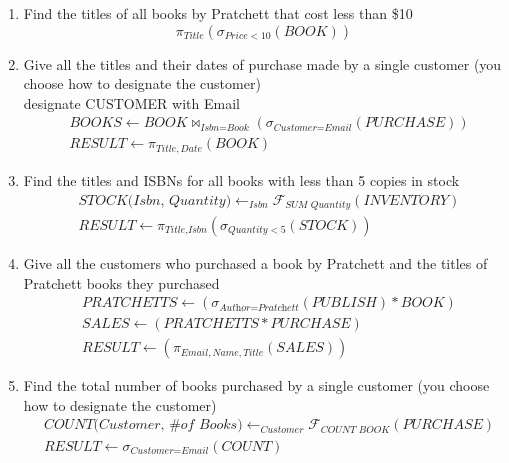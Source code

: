 \documentclass[12pt, letterpaper]{report}
\begin{document}
\begin{enumerate}
\begin{enumerate}
  \item Find the titles of all books by Pratchett that cost less than \$10
    \begin{equation*}
      \pi_{\textit{Title}}(\sigma_{\textit{Price} < 10}(BOOK))
    \end{equation*}

  \item Give all the titles and their dates of purchase made by a single
    customer (you choose how to designate the customer)\\
    designate CUSTOMER with Email
    \begin{align*}
      &\textit{BOOKS} \leftarrow \textit{BOOK} \bowtie_{\textit{Isbn} = \textit{Book}} (\sigma_{\textit{Customer}=\textit{Email}}(\textit{PURCHASE}))\\
      &\textit{RESULT} \leftarrow \pi_{Title, Date} (\textit{BOOK})
    \end{align*}

  \item Find the titles and ISBNs for all books with less than 5 copies in stock
    \begin{align*}
      &\textit{STOCK(Isbn, Quantity)} \leftarrow _{\textit{Isbn}}\mathcal{F}_{\textit{SUM Quantity}}(\textit{INVENTORY})\\
      &\textit{RESULT} \leftarrow \pi_{\textit{Title}, \textit{Isbn}}(\sigma_{\textit{Quantity} < 5}(STOCK))
    \end{align*}

  \item Give all the customers who purchased a book by Pratchett and the titles of Pratchett books they purchased
    \begin{align*}
      &\textit{PRATCHETTS} \leftarrow (\sigma_{\textit{Author} = \textit{Pratchett}}(\textit{PUBLISH}) * \textit{BOOK})\\
      &\textit{SALES} \leftarrow (\textit{PRATCHETTS} * \textit{PURCHASE})\\
      &\textit{RESULT} \leftarrow (\pi_{\textit{Email}, \textit{Name}, \textit{Title}}(\textit{SALES}))
    \end{align*}

  \item Find the total number of books purchased by a single customer (you choose how to designate the customer)
    \begin{align*}
      &\textit{COUNT(Customer, \# of Books)} \leftarrow _{\textit{Customer}}\mathcal{F}_{\textit{COUNT BOOK}}(\textit{PURCHASE})\\
      &\textit{RESULT} \leftarrow \sigma_{\textit{Customer} = \textit{Email}}(\textit{COUNT})
    \end{align*}


\end{enumerate}
\end{enumerate}
\end{document}
